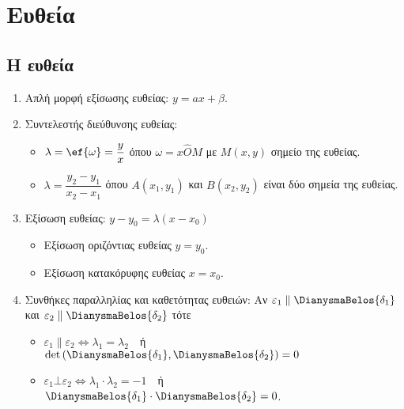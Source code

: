 \documentclass[11pt,a4paper]{article}
\begin{document}
\section{Ευθεία}
\subsection{Η ευθεία }
\begin{enumerate}
\item Απλή μορφή εξίσωσης ευθείας: $ y=ax+\beta $.
\item Συντελεστής διεύθυνσης ευθείας: 
\begin{itemize}
\item $ \lambda=\ef{\omega}=\dfrac{y}{x} $ όπου $ \omega=x\hat{O}M $ με $ M(x,y) $ σημείο της ευθείας.
\item $ \lambda=\dfrac{y_2-y_1}{x_2-x_1} $ όπου $ A(x_1,y_1) $ και $ B(x_2,y_2) $ είναι δύο σημεία της ευθείας.
\end{itemize}
\item Εξίσωση ευθείας: $ y-y_0=\lambda(x-x_0) $
\begin{itemize}
\item Εξίσωση οριζόντιας ευθείας $ y=y_0 $.
\item Εξίσωση κατακόρυφης ευθείας $ x=x_0 $.
\end{itemize}
\item Συνθήκες παραλληλίας και καθετότητας ευθειών: Αν $ \varepsilon_1\parallel\DianysmaBelos{\delta_1} $ και $ \varepsilon_2\parallel\DianysmaBelos{\delta_2} $ τότε
\begin{itemize}
\item $ \varepsilon_1\parallel\varepsilon_2\Leftrightarrow\lambda_1=\lambda_2 $\ \  ή\ \  $ \det{\left(\DianysmaBelos{\delta_1},\DianysmaBelos{\delta_2}\right)}=0 $
\item $ \varepsilon_1\bot\varepsilon_2\Leftrightarrow\lambda_1\cdot\lambda_2=-1 $\ \ ή\ \ $ \DianysmaBelos{\delta_1}\cdot\DianysmaBelos{\delta_2}=0 $.
\end{itemize}
\end{enumerate}
\end{document}
